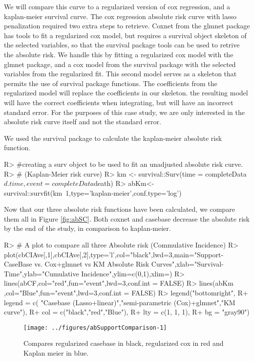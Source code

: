 \documentclass[
]{jss}
\begin{document}
We will compare this curve to a regularized version of cox regression,
and a kaplan-meier survival curve. The cox regression absolute risk
curve with lasso penalization required two extra steps to retrieve.
Coxnet from the glmnet package has tools to fit a regularized cox model,
but requires a survival object skeleton of the selected variables, so
that the survival package tools can be used to retrive the absolute
risk. We handle this by fitting a regularized cox model with the glmnet
package, and a cox model from the survival package with the selected
variables from the regularized fit. This second model serves as a
skeleton that permits the use of survival package functions. The
coefficients from the regularized model will replace the coefficients in
our skeleton. the resulting model will have the correct coefficients
when integrating, but will have an incorrect standard error. For the
purposes of this case study, we are only interested in the absolute risk
curve itself and not the standard error.

We used the survival package to calculate the kaplan-meier absolute risk
function.

\begin{CodeChunk}

\begin{CodeInput}
R> #creating a surv object to be used to fit an unadjusted absolute risk curve.
R> # (Kaplan-Meier risk curve)
R> km <- survival::Surv(time = completeData$d.time, event = completeData$death)
R> abKm<-survival::survfit(km~1,type='kaplan-meier',conf.type='log')
\end{CodeInput}
\end{CodeChunk}

Now that our three absolute risk functions have been calculated, we
compare them all in Figure \ref{fig:abSC}. Both coxnet and casebase
decrease the absolute risk by the end of the study, in comparison to
kaplan-meier.

\begin{CodeChunk}

\begin{CodeInput}
R> # A plot to compare all three Absolute risk (Commulative Incidence)
R> plot(cbCIAve[,1],cbCIAve[,2],type='l',col="black",lwd=3,main="Support- CaseBase vs. Cox+glmnet vs KM Absolute Risk Curves",xlab="Survival-Time",ylab="Cumulative Incidence",ylim=c(0,1),xlim=)
R> lines(abCF,col="red",fun="event",lwd=3,conf.int = FALSE)
R> lines(abKm ,col="Blue",fun="event",lwd=3,conf.int = FALSE)
R> legend("bottomright", 
R+        legend = c( "Casebase (Lasso+linear)","semi-parametric (Cox)+glmnet","KM curve"), 
R+        col = c("black","red","Blue"),
R+        lty = c(1, 1, 1), 
R+        bg = "gray90")
\end{CodeInput}
\begin{figure}

{\centering \texttt{[image: ../figures/abSupportComparison-1]} 

}

\caption{\label{fig:abSC} Compares regularized casebase in black, regularized cox in red and Kaplan meier in blue.}\label{fig:abSupportComparison}
\end{figure}
\end{CodeChunk}
\end{document}
